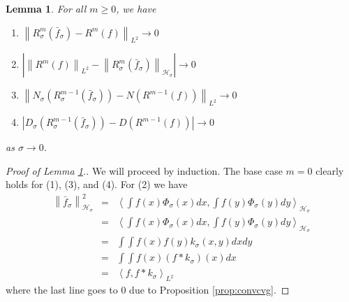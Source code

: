 \documentclass{article} %
\def\hsig{{\mathcal{H}_\sigma}}
\def\ksig{{k_\sigma}}
\def\gkde{{\bar{f}_\sigma}} %
\def\fm{{\Phi_\sigma}} %
\def\girwlm{{R_{\sigma}^m}}
\def\l{\left}
\def\r{\right}
\newtheorem{lem}{Lemma}
\theoremstyle{definition}
\begin{document}
\begin{lem}\label{lem:gl2cvg}
	For all $m\ge0$, we have 
	\begin{enumerate}
		\item $\l\| \girwlm \left( \gkde \right) - R^m\left( f \right)\r\|_{L^2} \to 0  $
		\item $\l|\l\|R^m(f)\r\|_{L^2} - \l\|R_\sigma^m \left( \gkde \right)\r\|_\hsig \r| \to 0$
		\item $\l\| N_\sigma\left( R_\sigma^{m-1}\left( \gkde \right) \right) - N\l(R^{m-1}\left( f \right)\r)\r\|_{L^2} \to 0$
		\item $\l| D_\sigma\left( R_\sigma^{m-1}\left( \gkde \right) \right) - D\l(R^{m-1}\left( f \right)\r)\r|\to 0$
	\end{enumerate}
	as  $\sigma \to 0$.
\end{lem}
\begin{proof}[Proof of Lemma \ref{lem:gl2cvg}.]
	We will proceed by induction. The base case $m=0$ clearly holds for (1), (3), and (4). For (2) we have
	\begin{eqnarray*}
		\l\|\gkde\r\|_\hsig^2 &=& \l<\int f(x) \fm(x) dx, \int f(y) \fm(y) dy\r>_\hsig \\
				      &=& \l<\int f(x) \fm(x) dx, \int f(y) \fm(y) dy\r>_\hsig \\
			&=& \int \int f(x) f(y) \ksig\left( x,y \right)dxdy\\
		 &=& \int \int f(x) \left( f\ast \ksig \right)(x) dx\\
		 &=& \l<f,f\ast \ksig\r>_{L^2}
	\end{eqnarray*}
	where the last line goes to $0$ due to Proposition \ref{prop:convcvg}.	


\end{proof}
\end{document}
